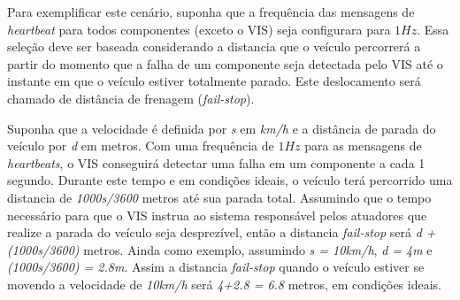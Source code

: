 \documentclass[conference]{IEEEtran}
\begin{document}


Para exemplificar este cenário, suponha que a frequência das mensagens de \textit{heartbeat} para todos componentes (exceto o VIS) seja configurara para $1Hz$. Essa seleção deve ser baseada considerando a distancia que o veículo percorrerá a partir do momento que a falha de um componente seja detectada pelo VIS até o instante em que o veículo estiver totalmente parado. Este deslocamento será chamado de distância de frenagem (\textit{fail-stop}).

Suponha que a velocidade é definida por \textit{s} em \textit{km/h} e a distância de parada do veículo por \textit{d} em metros. Com uma frequência de $1Hz$ para as mensagens de \textit{heartbeats}, o VIS conseguirá detectar uma falha em um componente a cada 1 segundo. Durante este tempo e em condições ideais, o veículo terá percorrido uma distancia de \textit{1000s/3600} metros até sua parada total. Assumindo que o tempo necessário para que o VIS instrua ao sistema responsável pelos atuadores que realize a parada do veículo seja desprezível, então a distancia \textit{fail-stop} será \textit{d + (1000s/3600)} metros. Ainda como exemplo, assumindo \textit{s = 10km/h}, \textit{d = 4m} e \textit{(1000s/3600) = 2.8m}. Assim a distancia \textit{fail-stop} quando o veículo estiver se movendo a velocidade de \textit{10km/h} será \textit{4+2.8 = 6.8} metros, em condições ideais.
\end{document}
